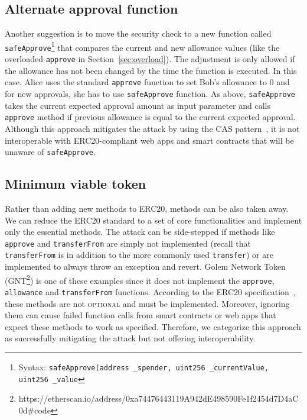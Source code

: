 
\subsection{Alternate approval function}

Another suggestion \cite{Ref16} is to move the security check to a new function called \texttt{safeApprove}\footnote{Syntax: \texttt{safeApprove(address \_spender, uint256 \_currentValue, uint256 \_value}} that compares the current and new allowance values (like the overloaded \texttt{approve} in Section~\ref{sec:overload}). The adjustment is only allowed if the allowance has not been changed by the time the function is executed. In this case, Alice uses the standard \texttt{approve} function to set Bob’s allowance to 0 and for new approvals, she has to use \texttt{safeApprove} function. As above, \texttt{safeApprove} takes the current expected approval amount as input parameter and calls \texttt{approve} method if previous allowance is equal to the current expected approval. Although this approach mitigates the attack by using the CAS pattern~\cite{Ref06}, it is not interoperable with ERC20-compliant web apps and smart contracts that will be unaware of \texttt{safeApprove}.


\subsection{Minimum viable token}

Rather than adding new methods to ERC20, methods can be also taken away. We can reduce the ERC20 standard to a set of core functionalities and implement only the essential methods. The attack can be side-stepped if methods like \texttt{approve} and \texttt{transferFrom} are simply not implemented (recall that \texttt{transferFrom} is in addition to the more commonly used \texttt{transfer}) or are implemented to always throw an exception and revert. Golem Network Token (GNT\footnote{https://etherscan.io/address/0xa74476443119A942dE498590Fe1f2454d7\newline D4aC0d\#code}) is one of these examples since it does not implement the \texttt{approve}, \texttt{allowance} and \texttt{transferFrom} functions. According to the ERC20 specification~\cite{Ref08}, these methods are not \textsc{optional} and must be implemented. Moreover, ignoring them can cause failed function calls from smart contracts or web apps that expect these methods to work as specified. Therefore, we categorize this approach as successfully mitigating the attack but not offering interoperability.

